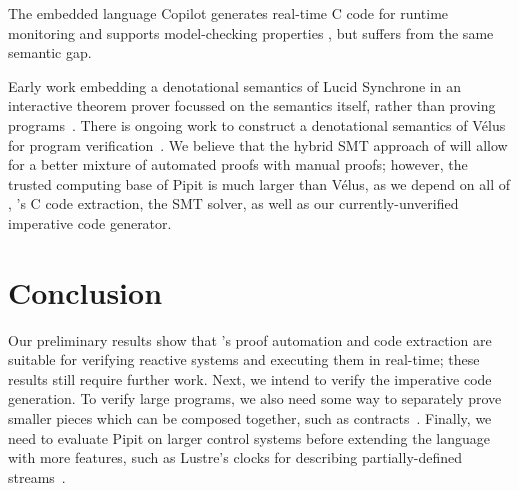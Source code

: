 \documentclass[sigplan,screen, review]{acmart}
\begin{document}
The embedded language Copilot generates real-time C code for runtime monitoring and supports model-checking properties \cite{laurent2015assuring}, but suffers from the same semantic gap.

Early work embedding a denotational semantics of Lucid Synchrone in an interactive theorem prover focussed on the semantics itself, rather than proving programs~\cite{boulme2001clocked}.
There is ongoing work to construct a denotational semantics of Vélus for program verification~\cite{bourke2022towards}.
We believe that the hybrid SMT approach of \fstar{} will allow for a better mixture of automated proofs with manual proofs;
however, the trusted computing base of Pipit is much larger than Vélus, as we depend on all of \fstar{}, \lowstar{}'s C code extraction, the SMT solver, as well as our currently-unverified imperative code generator.




\section{Conclusion}

Our preliminary results show that \fstar{}'s proof automation and code extraction are suitable for verifying reactive systems and executing them in real-time; these results still require further work.
Next, we intend to verify the imperative code generation.
To verify large programs, we also need some way to separately prove smaller pieces which can be composed together, such as contracts~\cite{champion2016kind2}.
Finally, we need to evaluate Pipit on larger control systems before extending the language with more features, such as Lustre's clocks for describing partially-defined streams~\cite{caspi1995functional}.
\end{document}
